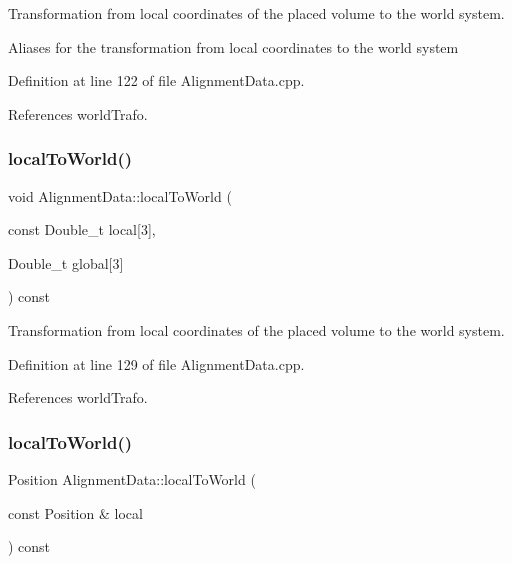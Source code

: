 Transformation from local coordinates of the placed volume to the world system. 

Aliases for the transformation from local coordinates to the world system 

Definition at line 122 of file Alignment\+Data.\+cpp.



References world\+Trafo.

\hypertarget{class_d_d4hep_1_1_alignments_1_1_alignment_data_aa8538578c348c8324770fbdef86c45fb}{}\label{class_d_d4hep_1_1_alignments_1_1_alignment_data_aa8538578c348c8324770fbdef86c45fb} 
\subsubsection{\texorpdfstring{local\+To\+World()}{localToWorld()}\hspace{0.1cm}{\footnotesize\ttfamily [3/5]}}
{\footnotesize\ttfamily void Alignment\+Data\+::local\+To\+World (\begin{DoxyParamCaption}\item[{const Double\+\_\+t}]{local\mbox{[}3\mbox{]},  }\item[{Double\+\_\+t}]{global\mbox{[}3\mbox{]} }\end{DoxyParamCaption}) const}



Transformation from local coordinates of the placed volume to the world system. 



Definition at line 129 of file Alignment\+Data.\+cpp.



References world\+Trafo.

\hypertarget{class_d_d4hep_1_1_alignments_1_1_alignment_data_a6576f66fc1a7edfa1330a1e176014acf}{}\label{class_d_d4hep_1_1_alignments_1_1_alignment_data_a6576f66fc1a7edfa1330a1e176014acf} 
\subsubsection{\texorpdfstring{local\+To\+World()}{localToWorld()}\hspace{0.1cm}{\footnotesize\ttfamily [4/5]}}
{\footnotesize\ttfamily Position Alignment\+Data\+::local\+To\+World (\begin{DoxyParamCaption}\item[{const Position \&}]{local }\end{DoxyParamCaption}) const}



